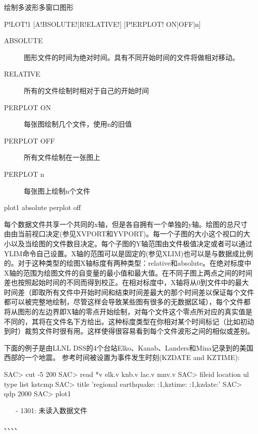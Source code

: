 \label{cmd:plot1}

绘制多波形多窗口图形

\begin{SACSTX}
P!LOT!1 [A!BSOLUTE!|R!ELATIVE!] [P!ERPLOT! ON|OFF|n]
\end{SACSTX}

\begin{description}
\item [ABSOLUTE] 图形文件的时间为绝对时间。具有不同开始时间的文件将做相对移动。
\item [RELATIVE] 所有的文件绘制时相对于自己的开始时间
\item [PERPLOT ON] 每张图绘制几个文件，使用n的旧值 
\item [PERPLOT OFF] 所有文件绘制在一张图上 
\item [PERPLOT n] 每张图上绘制n个文件 
\end{description}

\begin{SACDFT}
plot1 absolute perplot off
\end{SACDFT}

每个数据文件共享一个共同的x轴，但是各自拥有一个单独的y轴。绘图的总尺寸由由当前视口决定(参见XVPORT和YVPORT)。每一个子图的大小这个视口的大小以及当绘图的文件数目决定。每个子图的Y轴范围由文件极值决定或者可以通过YLIM命令自己设置。X轴的范围可以是固定的(参见XLIM)也可以是与数据成比例的。对于这种类型的绘图X轴标度有两种类型：relative和absolute。在绝对标度中X轴的范围为绘图文件的自变量的最小值和最大值。在不同子图上两点之间的时间差也按照起始时间的不同而得到校正。在相对标度中，X轴将从0到文件中的最大时间差（即取所有文件中开始时间和结束时间差最大的那个时间差以保证每个文件都可以被完整地绘制，尽管这样会导致某些图有很多的无数据区域），每个文件都将从图形的左边界即X轴的零点开始绘制，对每个文件这个零点所对应的真实值是不同的，其将在文件名下方给出。这种标度类型在你相对某个时间标记（比如初动到时）裁剪文件时很有用。这样使得很容易看到每个文件波形之间的相似或差别。

下面的例子是由LLNL DSS的4个台站Elko、Kanab、Landers和Mina记录到的美国西部的一个地震。
参考时间被设置为事件发生时刻(KZDATE and KZTIME):
\begin{SACCode}
SAC> cut -5 200
SAC> read *v
 elk.v knb.v lac.v mnv.v
SAC> fileid location ul type list kstcmp
SAC> title 'regional earthquake:  :1,kztime:  :1,kzdate:'
SAC> qdp 2000
SAC> plot1
\end{SACCode}

\begin{itemize}
\item[-]1301: 未读入数据文件
\end{itemize}

、、、、
